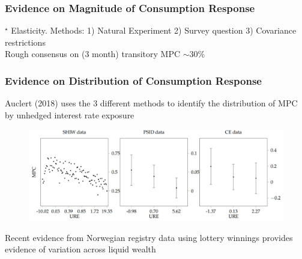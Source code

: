 \documentclass{beamer}
\begin{document}
\frame
{
	\frametitle{Evidence on Magnitude of Consumption Response}
	\resizebox{\textwidth}{!}{
	\centering
		 }
\tiny{$^{\star}$ Elasticity. Methods: 1) Natural Experiment 2) Survey question 3) Covariance restrictions} \\
\scriptsize Rough consensus on (3 month) transitory MPC $\sim 30\%$
}
\frame
{
	\frametitle{Evidence on Distribution of Consumption Response}
	Auclert (2018) uses the 3 different methods to identify the distribution of MPC by unhedged interest rate exposure
	\begin{figure}
		\includegraphics[scale=0.6]{../Figures/MPCDistributionAuclert}
	\end{figure}
	Recent evidence from Norwegian registry data using lottery winnings provides evidence of variation across liquid wealth
}
\end{document}

